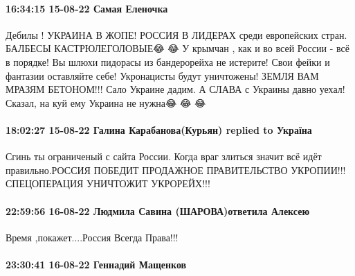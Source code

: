  
 
 
 
 

\paragraph{16:34:15 15-08-22 Самая Еленочка}

Дебилы ! УКРАИНА В ЖОПЕ! РОССИЯ В ЛИДЕРАХ среди европейских стран. БАЛБЕСЫ
КАСТРЮЛЕГОЛОВЫЕ😂 😂 У крымчан , как и во всей России - всё в порядке! Вы шлюхи
пидорасы из бандерорейха не истерите! Свои фейки и фантазии оставляйте себе!
Укронацисты будут уничтожены! ЗЕМЛЯ ВАМ МРАЗЯМ БЕТОНОМ!!! Сало Украине дадим. А
СЛАВА с Украины давно уехал! Сказал, на куй ему Украина не нужна😂 😂 😂

\paragraph{18:02:27 15-08-22 Галина Карабанова(Курьян) replied to Україна}

Сгинь ты ограниченый с сайта России. Когда враг злиться значит всё идёт
правильно.РОССИЯ ПОБЕДИТ ПРОДАЖНОЕ ПРАВИТЕЛЬСТВО УКРОПИИ!!! СПЕЦОПЕРАЦИЯ
УНИЧТОЖИТ УКРОРЕЙХ!!!

\paragraph{22:59:56 16-08-22 Людмила Савина (ШАРОВА)ответила Алексею}

Время ,покажет....Россия Всегда Права!!!

\paragraph{23:30:41 16-08-22 Геннадий Мащенков}

